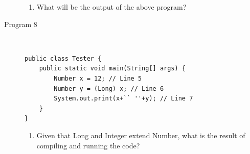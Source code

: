 \documentclass[11pt,a4paper]{article}
\def\AnswerBox{\fbox{\begin{minipage}{4in}\hfill\vspace{0.5in}\end{minipage}}}
\begin{document}
\begin{description}
\AnswerBox

\begin{enumerate}[label=\bfseries Q\arabic*:]\itemsep10pt
\item What will be the output of the above program?
\end{enumerate}

\item [Program 8] \
\begin{lstlisting}
public class Tester {
    public static void main(String[] args) {
        Number x = 12; // Line 5
        Number y = (Long) x; // Line 6
        System.out.print(x+`` ''+y); // Line 7
    }
}
\end{lstlisting}

\AnswerBox

\begin{enumerate}[label=\bfseries Q\arabic*:]\itemsep10pt
\item Given that Long and Integer extend Number, what is the result of compiling and running the code?
\end{enumerate}
\end{description}
\end{document}
